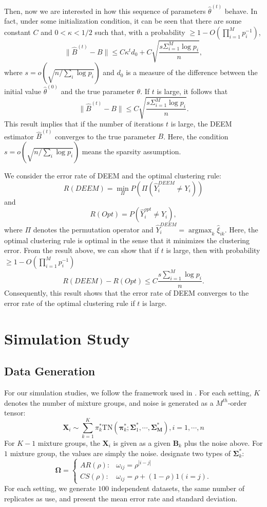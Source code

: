 \documentclass[11pt]{article}
\newcommand{\amax}{\operatorname*{argmax}}
\newcommand{\wh}{\widehat}
\begin{document}
Then, now we are interested in how this sequence of parameters $\wh\theta^{(t)}$ behave.
In fact, under some initialization condition, it can be seen that there are some constant $C$ and $0<\kappa<1/2$ such that, with a probability $\ge 1- O(\prod_{i=1}^M p_i^{-1})$,
$$
\|\wh B^{(t)} - B\| \le C \kappa^t d_0 + C\sqrt{\frac{s \Sigma_{i=1}^M \log p_i}{n}},
$$
where $s=o(\sqrt{n/\sum_i \log p_i})$ and $d_0$ is a measure of the difference between the initial value $\wh \theta^{(0)}$ and the true parameter $\theta$.
If  $t$ is large, it follows that
$$
\|\wh B^{(t)} - B\| \le C\sqrt{\frac{s \Sigma_{i=1}^M \log p_i}{n}}.
$$
This result implies that if the number of iterations $t$ is large, the DEEM estimator $\wh B^{(t)}$ converges to the true parameter $B$.
Here, the condition $s=o(\sqrt{n/\sum_i \log p_i})$ means the sparsity assumption.

We consider the error rate of DEEM and the optimal clustering rule:
$$
R(DEEM)= \min_{\Pi} P(\Pi(\wh Y_i^{DEEM} \neq Y_i))
$$
and
$$
R(Opt)= P(\wh Y_i^{opt} \neq Y_i),
$$
where $\Pi$ denotes the permutation operator and $\wh Y_i^{DEEM}= \amax_k \wh\xi_{ik}$.
Here, the optimal clustering rule is optimal in the sense that it minimizes the clustering error.
From the result above, we can show that if $t$ is large, then with probability $\ge 1- O(\prod_{i=1}^M p_i^{-1})$
$$
R(DEEM) - R(Opt) \le C \frac{s\sum_{i=1}^M \log p_i}{n}.
$$
Consequently, this result shows that the error rate of DEEM converges to the error rate of the optimal clustering rule if $t$ is large.


\section{Simulation Study}

\subsection{Data Generation}

For our simulation studies, we follow the framework used in \cite{mai2022DEEM}. For each setting, $K$ denotes the number of mixture groups, and noise is generated as a $M^{th}$-order tensor:  
\begin{equation}
    \mathbf{X}_i \sim \sum_{k=1}^K \pi^*_k \mbox{TN} (\boldsymbol{\pi}^*_k; \boldsymbol{\Sigma}^*_1, \cdots, \boldsymbol{\Sigma^*_M}), i = 1, \cdots, n
\end{equation}
For $K-1$ mixture groups, the $\mathbf{X}_i$ is given as a given $\mathbf{B}_k$ plus the noise above. For $1$ mixture group, the values are simply the noise. \cite{mai2022DEEM} designate two types of $\boldsymbol{\Sigma}^*_k$: 
\[  \boldsymbol{\Omega} =   \begin{cases}
     AR(\rho): & \omega_{ij} = \rho^{|i-j|} \\
    CS(\rho): & \omega_{ij} = \rho + (1-\rho) 1(i=j).
\end{cases}\]
For each setting, we generate $100$ independent datasets, the same number of replicates as \cite{mai2022DEEM} use, and present the mean error rate and standard deviation. 
\end{document}

